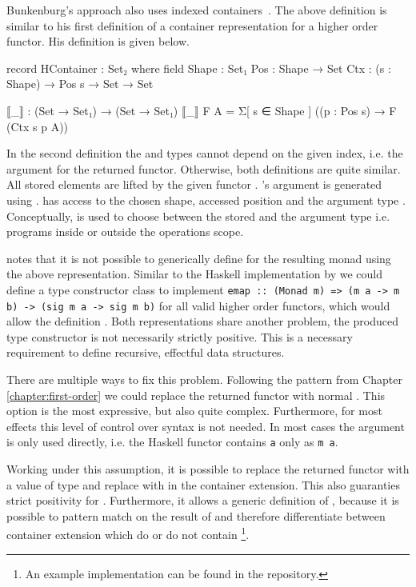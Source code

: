 Bunkenburg's approach also uses indexed containers~\cite{bunkenburg2019modeling}.
The above definition is similar to his first definition of a container
representation for a higher order functor.
His definition is given below.
\begin{code}
record HContainer : Set₂ where
  field
    Shape : Set₁
    Pos : Shape → Set
    Ctx : (s : Shape) → Pos s → Set → Set

  ⟦_⟧ : (Set → Set₁) → (Set → Set₁)
  ⟦_⟧ F A = Σ[ s ∈ Shape ] ((p : Pos s) → F (Ctx s p A))
\end{code}
In the second definition the  and  types cannot
depend on the given index, i.e. the argument for the returned functor.
Otherwise, both definitions are quite similar.
All stored elements are lifted by the given functor .
's argument is generated using .
 has access to the chosen shape, accessed position and the 
argument type .
Conceptually,  is used to choose between the stored
 and the argument type  i.e. programs inside or
outside the operations scope.

\textcite{bunkenburg2019modeling} notes that it is not possible to generically
define \AgdaFunction{>>=} for the resulting monad using the above
representation.
Similar to the Haskell implementation by \textcite{DBLP:conf/haskell/WuSH14} we
could define a type constructor class to implement
\texttt{emap :: (Monad m) => (m a -> m b) -> (sig m a
-> sig m b)}
for all valid higher order functors, which would allow the definition
\AgdaFunction{>>=}.
Both representations share another problem, the produced type constructor is not
necessarily strictly positive.
This is a necessary requirement to define recursive, effectful data structures.

There are multiple ways to fix this problem.
Following the pattern from Chapter \ref{chapter:first-order} we could replace
the returned functor with normal .
This option is the most expressive, but also quite complex.
Furthermore, for most effects this level of control over syntax is not needed.
In most cases the argument  is only used directly, i.e. the
Haskell functor contains \texttt{a} only as \texttt{m a}.

Working under this assumption, it is possible to replace the returned functor
with a value of type \AgdaSpace{} and
replace  with  in the
container extension.
This also guaranties strict positivity for .
Furthermore, it allows a generic definition of \AgdaFunction{>>=}, because it is
possible to pattern match on the result of  and therefore
differentiate between container extension which do or do not contain
\footnote{An example implementation can be found in the
  repository.}.
 
